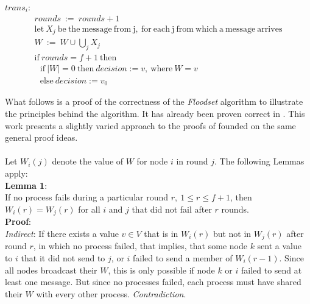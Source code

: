 \documentclass[fleqn]{article}
\begin{document}
\begin{mdframed}[nobreak=true, backgroundcolor=light-gray, roundcorner=10pt,leftmargin=1, rightmargin=1, innerleftmargin=15, innertopmargin=15,innerbottommargin=15, outerlinewidth=1, linecolor=light-gray]
\noindent $trans_i$:
\begin{gather*}
  rounds\ :=\ rounds+1\\
  \mathrm{let}\ X_j\ \mathrm{be\ the\ message\ from\ j,\ for\ each\ j\ from\ which\ a\ message\ arrives}\\
  W\ :=\ W \cup \bigcup_{j} X_j\\
  \mathrm{if}\ rounds = f+1\ \mathrm{then}\\
  \ \ \   \mathrm{if}\ |W| = 0\ \mathrm{then}\ decision := v,\ \mathrm{where}\ W = {v}\\
  \ \ \   \mathrm{else}\ decision := v_0
\end{gather*}
\end{mdframed}

\noindent What follows is a proof of the correctness of the \textit{Floodset} algorithm to illustrate the principles behind the algorithm. It has already been proven correct in \cite{refNancy}. This work presents a slightly varied approach to the proofs of \cite{refNancy} founded on the same general proof ideas.\\
\\
\noindent Let $W_i(j)$ denote the value of $W$ for node $i$ in round $j$. The following Lemmas apply:\\

\noindent \textbf{Lemma 1}:\\
If no process fails during a particular round $r,\ 1 \le r \le f + 1$, then $W_i(r) = W_j(r)$ for all $i$ and $j$ that did not fail after $r$ rounds.\\
\textbf{Proof}:\\
\textit{Indirect}: If there exists a value $v \in V$ that is in $W_i(r)$ but not in $W_j(r)$ after round $r$, in which no process failed, that implies, that some node $k$ sent a value to $i$ that it did not send to $j$, or $i$ failed to send a member of $W_i(r-1)$. Since all nodes broadcast their $W$, this is only possible if node $k$ or $i$ failed to send at least one message. But since no processes failed, each process must have shared their $W$ with every other process. \textit{Contradiction}. \\
\end{document}
